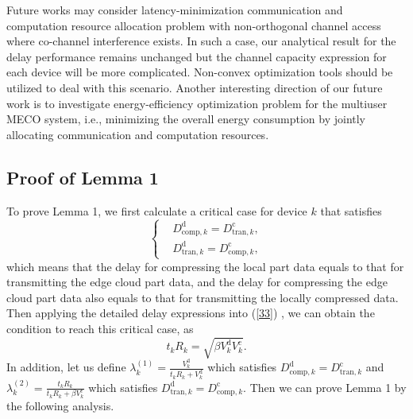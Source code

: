\documentclass[journal,draftcls,onecolumn,12pt,twoside]{IEEEtran}
\begin{document}
Future works may consider latency-minimization communication and computation resource allocation problem with non-orthogonal channel access where co-channel interference exists. In such a case, our analytical result for the delay performance remains unchanged but the channel capacity expression for each device will be more complicated. Non-convex optimization tools should be utilized to deal with this scenario. Another interesting direction of our future work is to investigate energy-efficiency optimization problem for the multiuser MECO system, i.e., minimizing the overall energy consumption by jointly allocating communication and computation resources.

\begin{appendices}
\section{Proof of Lemma 1}
 To prove Lemma 1, we first calculate a critical case for device $k$ that satisfies
\begin{equation}
	\left\{
    \begin{aligned}
        &D_{\text{comp},k}^{\text{d}} = D_{{\text{tran},k}}^{\text{c}},\\
        &D_{\text{tran},k}^{\text{d}} = D_{{\text{comp},k}}^{\text{c}},
	\end{aligned}
    \right. \label{33}
\end{equation}
which means that the delay for compressing the local part data equals to that for transmitting the edge cloud part data, and the delay for compressing the edge cloud part data also equals to that for transmitting the locally compressed data. Then applying the detailed delay expressions into (\ref{33}) , we can obtain the condition to reach this critical case, as
\begin{equation}
    t_k R_k = \sqrt{\beta V_k^{\text{d}}V_k^{\text{c}}}.\label{34}
\end{equation}
In addition, let us define $\lambda_k^{(1)} = \frac{V_k^{\text{d}}}{t_k R_k+V_k^{\text{d}}}$ which satisfies $D_{\text{comp},k}^{\text{d}} = D_{{\text{tran},k}}^{\text{c}}$ and $\lambda_k^{(2)} = \frac{t_k R_k}{t_k R_k+\beta V_k^{\text{c}}}$ which satisfies $D_{\text{tran},k}^{\text{d}} = D_{{\text{comp},k}}^{\text{c}}$.
Then we can prove Lemma 1 by the following analysis.

\end{appendices}
\end{document}
